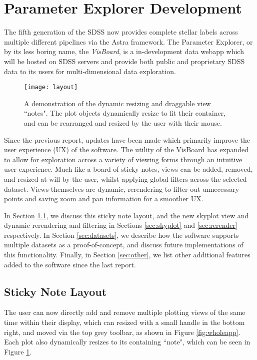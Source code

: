 \documentclass[a4paper,10pt,twocolumn]{article}
\begin{document}
\section{Parameter Explorer Development}
The fifth generation of the SDSS now provides complete stellar labels across multiple different pipelines via the Astra framework. The Parameter Explorer, or by its less boring name, the \emph{VisBoard}, is a in-development data webapp which will be hosted on SDSS servers and provide both public and proprietary SDSS data to its users for multi-dimensional data exploration.
\begin{figure}[tp]
	\centering
	\texttt{[image: layout]}
	\caption{A demonstration of the dynamic resizing and draggable view ``notes". The plot objects dynamically resize to fit their container, and can be rearranged and resized by the user with their mouse.}
	\label{fig:layout}
\end{figure}

Since the previous report, updates have been made which primarily improve the user experience (UX) of the software. The utility of the VisBoard has expanded to allow for exploration across a variety of viewing forms through an intuitive user experience. Much like a board of sticky notes, views can be added, removed, and resized at will by the user, whilst applying global filters across the selected dataset. Views themselves are dynamic, rerendering to filter out unnecessary points and saving zoom and pan information for a smoother UX.

In Section \ref{sec:sticky}, we discuss this sticky note layout, and the new skyplot view and dynamic rerendering and filtering in Sections \ref{sec:skyplot} and \ref{sec:rerender} respectively. In Section \ref{sec:datasets}, we describe how the software supports multiple datasets as a proof-of-concept, and discuss future implementations of this functionality. Finally, in Section \ref{sec:other}, we list other additional features added to the software since the last report.

\subsection{Sticky Note Layout}
\label{sec:sticky}
The user can now directly add and remove multiple plotting views of the same time within their display, which can resized with a small handle in the bottom right, and moved via the top grey toolbar, as shown in Figure \ref{fig:wholeapp}. Each plot also dynamically resizes to its containing ``note", which can be seen in Figure \ref{fig:layout}.
\end{document}

